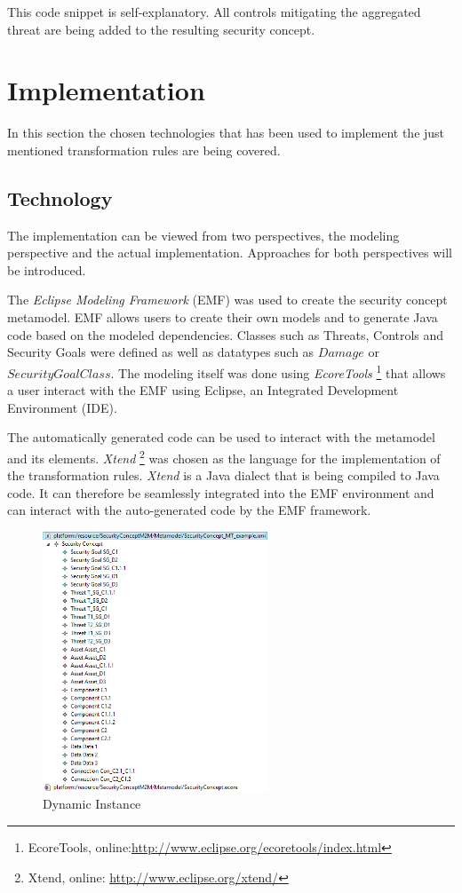This code snippet is self-explanatory. All controls mitigating the aggregated threat are being added to the resulting security concept.

\section{Implementation}
\label{sec:implementation}

In this section the chosen technologies that has been used to implement the just mentioned transformation rules are being covered. 

\subsection{Technology}

The implementation can be viewed from two perspectives, the modeling perspective and the actual implementation. Approaches for both perspectives will be introduced.

The \textit{Eclipse Modeling Framework} (EMF) was used to create the security concept metamodel. EMF allows users to create their own models and to generate Java code based on the modeled dependencies. Classes such as Threats, Controls and Security Goals were defined as well as datatypes such as $Damage$ or $SecurityGoalClass$. The modeling itself was done using \textit{EcoreTools} \footnote{EcoreTools, online:\url{http://www.eclipse.org/ecoretools/index.html} } that allows a user interact with the EMF using Eclipse, an Integrated Development Environment (IDE).

The automatically generated code can be used to interact with the metamodel and its elements. \textit{Xtend} \footnote{Xtend, online: \url{http://www.eclipse.org/xtend/}} was chosen as the language for the implementation of the transformation rules. \textit{Xtend} is a Java dialect that is being compiled to Java code. It can therefore be seamlessly integrated into the EMF environment and can interact with the auto-generated code by the EMF framework.    

\begin{figure}[H]
\centering
\includegraphics[width=0.6\textwidth]{pictures/dynamic_instance}
\caption{Dynamic Instance}
\end{figure}

